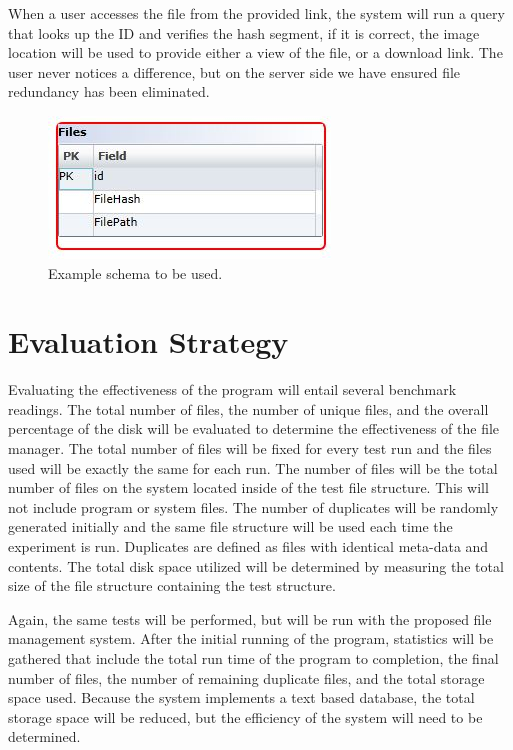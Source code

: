 \documentclass[11pt]{article}
\begin{document}
When a user accesses the file from the provided link, the system will run a query that looks up the ID and verifies the hash segment, if it is correct, the image location will be used to provide either a view of the file, or a download link. The user never notices a difference, but on the server side we have ensured file redundancy has been eliminated.

\begin{figure}
\begin{center}
\includegraphics[scale=.8]{schema}
\caption{\label{fig:schema} Example schema to be used.}
\end{center}
\end{figure}

\vspace*{-.2in}
\section{Evaluation Strategy}
\label{sec:evaluate}
\vspace*{-.1in}

Evaluating the effectiveness of the program will entail several benchmark readings. The total number of files, the number of unique files, and the overall percentage of the disk will be evaluated to determine the effectiveness of the file manager. The total number of files will be fixed for every test run and the files used will be exactly the same for each run. The number of files will be the total number of files on the system located inside of the test file structure. This will not include program or system files. The number of duplicates will be randomly generated initially and the same file structure will be used each time the experiment is run. Duplicates are defined as files with identical meta-data and contents. The total disk space utilized will be determined by measuring the total size of the file structure containing the test structure.

Again, the same tests will be performed, but will be run with the proposed file management system. After the initial running of the program, statistics will be gathered that include the total run time of the program to completion, the final number of files, the number of remaining duplicate files, and the total storage space used. Because the system implements a text based database, the total storage space will be reduced, but the efficiency of the system will need to be determined.
\end{document}
